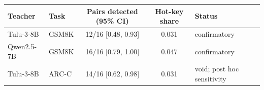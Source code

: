 \begin{tabular}{llccl}
\toprule
Teacher & Task & Pairs detected (95\% CI) & Hot-key share & Status\\
\midrule
Tulu-3-8B & GSM8K & 12/16 \scriptsize[0.48, 0.93] & 0.031 & confirmatory\\
Qwen2.5-7B & GSM8K & 16/16 \scriptsize[0.79, 1.00] & 0.047 & confirmatory\\
Tulu-3-8B & ARC-C & 14/16 \scriptsize[0.62, 0.98] & 0.031 & void; post hoc sensitivity\\
\bottomrule
\end{tabular}
